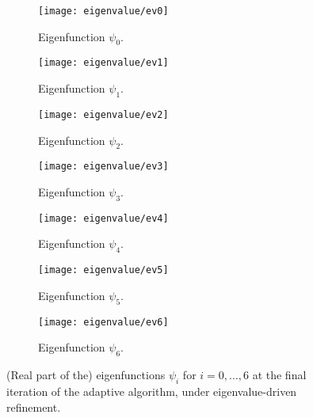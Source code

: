 \begin{figure}[htbp]
    \begin{subfigure}[t]{0.49\textwidth}
        \centering
        \texttt{[image: eigenvalue/ev0]}
        \caption{Eigenfunction \(\psi_0\).}
        \label{fig:eigenfunction_0}
    \end{subfigure}
    \begin{subfigure}[t]{0.49\textwidth}
        \centering
        \texttt{[image: eigenvalue/ev1]}
        \caption{Eigenfunction \(\psi_1\).}
        \label{fig:eigenfunction_1}
    \end{subfigure}
    \vspace{1cm}
    \begin{subfigure}[t]{0.49\textwidth}
        \centering
        \texttt{[image: eigenvalue/ev2]}
        \caption{Eigenfunction \(\psi_2\).}
        \label{fig:eigenfunction_2}
    \end{subfigure}
    \begin{subfigure}[t]{0.49\textwidth}
        \centering
        \texttt{[image: eigenvalue/ev3]}
        \caption{Eigenfunction \(\psi_3\).}
        \label{fig:eigenfunction_3}
    \end{subfigure}
    \vspace{1cm}
    \begin{subfigure}[t]{0.49\textwidth}
        \centering
        \texttt{[image: eigenvalue/ev4]}
        \caption{Eigenfunction \(\psi_4\).}
        \label{fig:eigenfunction_4}
    \end{subfigure}
    \begin{subfigure}[t]{0.49\textwidth}
        \centering
        \texttt{[image: eigenvalue/ev5]}
        \caption{Eigenfunction \(\psi_5\).}
        \label{fig:eigenfunction_5}
    \end{subfigure}
    \vspace{1cm}
    \begin{subfigure}[t]{0.49\textwidth}
        \centering
        \texttt{[image: eigenvalue/ev6]}
        \caption{Eigenfunction \(\psi_6\).}
        \label{fig:eigenfunction_6}
    \end{subfigure}
    \caption{(Real part of the) eigenfunctions \(\psi_i\) for \(i = 0, \ldots, 6\) at the final iteration of the adaptive algorithm, under eigenvalue-driven refinement.}
\end{figure}


